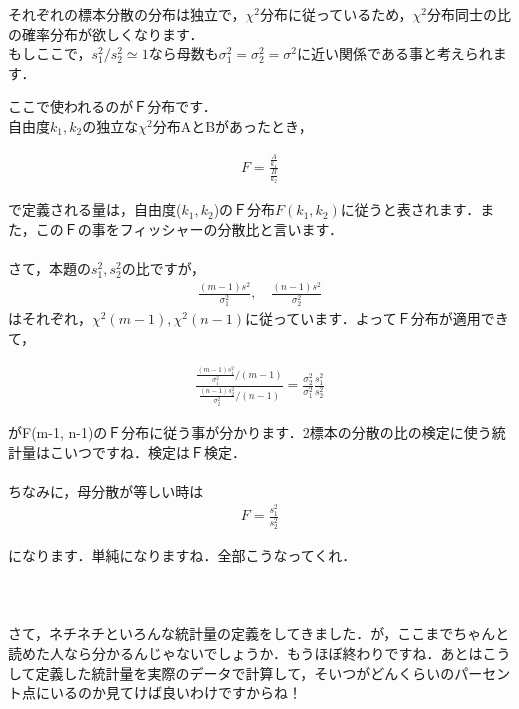 \documentclass[11pt,a4paper,uplatex]{ujreport} 	%
\begin{document}
それぞれの標本分散の分布は独立で，$\chi^2$分布に従っているため，$\chi^2$分布同士の比の確率分布が欲しくなります．\\

もしここで，$s_1^2/s_2^2≃1$なら母数も$\sigma_1^2 = \sigma_2^2=\sigma^2$に近い関係である事と考えられます．

ここで使われるのがＦ分布です．\\

自由度$k_1, k_2$の独立な$\chi^2$分布AとBがあったとき，

\begin{align}
  F = \frac{\frac{A}{k_1}}{\frac{B}{k_2}}
\end{align}

で定義される量は，自由度($k_1,k_2$)のＦ分布$F(k_1,k_2)$に従うと表されます．また，このＦの事をフィッシャーの分散比と言います．\\
\\

さて，本題の$s_1^2, s_2^2$の比ですが，
\begin{align}
  \frac{(m-1)s^2}{\sigma_1^2}, \quad \frac{(n-1)s^2}{\sigma_2^2}
\end{align}
はそれぞれ，$\chi^2(m-1), \chi^2(n-1)$に従っています．よってＦ分布が適用できて，

\begin{align}
  \frac{\frac{(m-1)s_1^2}{\sigma_1^2} / (m-1)}{\frac{(n-1)s_2^2}{\sigma_2^2} / (n-1)} = \frac{\sigma_2^2}{\sigma_1^2}\frac{s_1^2}{s_2^2}
  \label{eq:fisher}
\end{align}

がF(m-1, n-1)のＦ分布に従う事が分かります．2標本の分散の比の検定に使う統計量はこいつですね．検定はＦ検定．\\
\\

ちなみに，母分散が等しい時は
\begin{align}
  F= \frac{s_1^2}{s_2^2}
\end{align}

になります．単純になりますね．全部こうなってくれ．\\
\\
\\
\\

さて，ネチネチといろんな統計量の定義をしてきました．が，ここまでちゃんと読めた人なら分かるんじゃないでしょうか．もうほぼ終わりですね．あとはこうして定義した統計量を実際のデータで計算して，そいつがどんくらいのパーセント点にいるのか見てけば良いわけですからね！\\
\\
\end{document}
